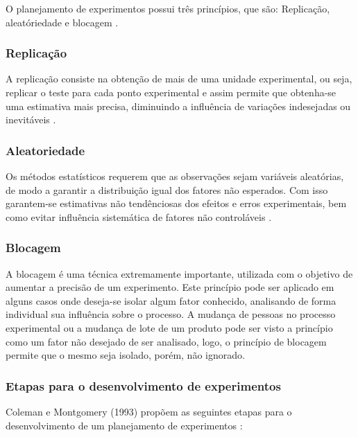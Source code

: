 O planejamento de experimentos possui três princípios, que são: Replicação, aleatóriedade e blocagem \cite{2}. 

\subsubsection*{Replicação}

A replicação consiste na obtenção de mais de uma unidade experimental, ou seja, replicar o teste para cada ponto experimental e assim permite que obtenha-se uma estimativa mais precisa, diminuindo a influência de variações indesejadas ou inevitáveis \cite{2}.

\subsubsection*{Aleatoriedade}

Os métodos estatísticos requerem que as observações sejam variáveis aleatórias, de modo a garantir a distribuição igual dos fatores não esperados. Com isso garantem-se estimativas não tendênciosas dos efeitos e erros experimentais, bem como evitar influência sistemática de fatores não controláveis \cite{2}. 
\subsubsection*{Blocagem}

A blocagem é uma técnica extremamente importante, utilizada com o objetivo de aumentar a precisão de um experimento. Este princípio pode ser aplicado em alguns casos onde deseja-se isolar algum fator conhecido, analisando de forma individual sua influência sobre o processo. A mudança de pessoas no processo experimental ou a mudança de lote de um produto pode ser visto a princípio como um fator não desejado de ser analisado, logo, o princípio de blocagem permite que o mesmo seja isolado, porém, não ignorado\cite{2}. 

\subsubsection{Etapas para o desenvolvimento de experimentos}
\label{subsec:etapas}

Coleman e Montgomery (1993) propõem as seguintes etapas para o desenvolvimento de um planejamento de experimentos \cite{3}:

